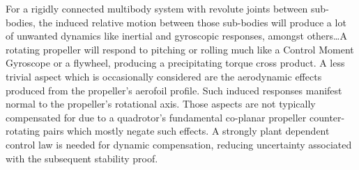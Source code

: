 \par
For a rigidly connected multibody system with revolute joints between sub-bodies, the induced relative motion between those sub-bodies will produce a lot of unwanted dynamics like inertial and gyroscopic responses, amongst others\ldots A rotating propeller will respond to pitching or rolling much like a Control Moment Gyroscope \cite{cmg} or a flywheel, producing a precipitating torque cross product. A less trivial aspect which is occasionally considered are the aerodynamic effects produced from the propeller's aerofoil profile. Such induced responses manifest normal to the propeller's rotational axis. Those aspects are not typically compensated for due to a quadrotor's fundamental co-planar propeller counter-rotating pairs which mostly negate such effects. A strongly plant dependent control law is needed for dynamic compensation, reducing uncertainty associated with the subsequent stability proof. 
